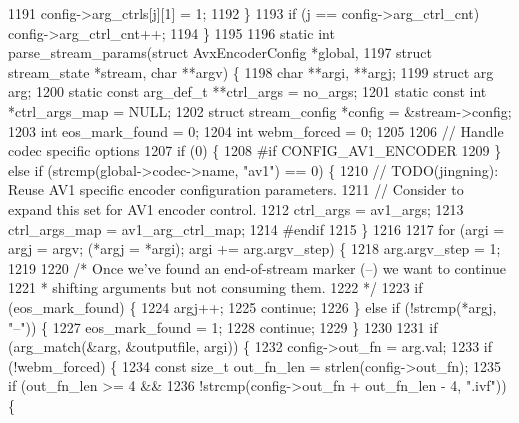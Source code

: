 \begin{DoxyCodeInclude}
{{{{{{{{{{{{{{{{1191     config->arg\_ctrls[j][1] = 1;
1192   \}
1193   \textcolor{keywordflow}{if} (j == config->arg\_ctrl\_cnt) config->arg\_ctrl\_cnt++;
1194 \}
1195 
1196 \textcolor{keyword}{static} \textcolor{keywordtype}{int} parse\_stream\_params(\textcolor{keyword}{struct} AvxEncoderConfig *global,
1197     \textcolor{keyword}{struct} stream\_state *stream, \textcolor{keywordtype}{char} **argv) \{
1198   \textcolor{keywordtype}{char} **argi, **argj;
1199   \textcolor{keyword}{struct }arg arg;
1200   \textcolor{keyword}{static} \textcolor{keyword}{const} arg\_def\_t **ctrl\_args = no\_args;
1201   \textcolor{keyword}{static} \textcolor{keyword}{const} \textcolor{keywordtype}{int} *ctrl\_args\_map = NULL;
1202   \textcolor{keyword}{struct }stream\_config *config = &stream->config;
1203   \textcolor{keywordtype}{int} eos\_mark\_found = 0;
1204   \textcolor{keywordtype}{int} webm\_forced = 0;
1205 
1206   \textcolor{comment}{// Handle codec specific options}
1207   \textcolor{keywordflow}{if} (0) \{
1208 \textcolor{preprocessor}{#if CONFIG\_AV1\_ENCODER}
1209   \} \textcolor{keywordflow}{else} \textcolor{keywordflow}{if} (strcmp(global->codec->name, \textcolor{stringliteral}{"av1"}) == 0) \{
1210     \textcolor{comment}{// TODO(jingning): Reuse AV1 specific encoder configuration parameters.}
1211     \textcolor{comment}{// Consider to expand this set for AV1 encoder control.}
1212     ctrl\_args = av1\_args;
1213     ctrl\_args\_map = av1\_arg\_ctrl\_map;
1214 \textcolor{preprocessor}{#endif}
1215   \}
1216 
1217   \textcolor{keywordflow}{for} (argi = argj = argv; (*argj = *argi); argi += arg.argv\_step) \{
1218     arg.argv\_step = 1;
1219 
1220     \textcolor{comment}{/* Once we've found an end-of-stream marker (--) we want to continue}
1221 \textcolor{comment}{     * shifting arguments but not consuming them.}
1222 \textcolor{comment}{     */}
1223     \textcolor{keywordflow}{if} (eos\_mark\_found) \{
1224       argj++;
1225       \textcolor{keywordflow}{continue};
1226     \} \textcolor{keywordflow}{else} \textcolor{keywordflow}{if} (!strcmp(*argj, \textcolor{stringliteral}{"--"})) \{
1227       eos\_mark\_found = 1;
1228       \textcolor{keywordflow}{continue};
1229     \}
1230 
1231     \textcolor{keywordflow}{if} (arg\_match(&arg, &outputfile, argi)) \{
1232       config->out\_fn = arg.val;
1233       \textcolor{keywordflow}{if} (!webm\_forced) \{
1234         \textcolor{keyword}{const} \textcolor{keywordtype}{size\_t} out\_fn\_len = strlen(config->out\_fn);
1235         \textcolor{keywordflow}{if} (out\_fn\_len >= 4 &&
1236             !strcmp(config->out\_fn + out\_fn\_len - 4, \textcolor{stringliteral}{".ivf"})) \{
}}}}}}}}}}}}}}}}
\end{DoxyCodeInclude}

